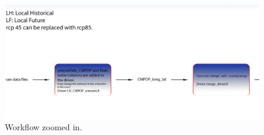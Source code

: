 \begin{enumerate}
\begin{figure}[htb]
  \centering
  \includegraphics[width=1\textwidth]{figures/pipe_Line_zoom}
  \caption{Workflow zoomed in.}
  \label{WorkflowZoom}
\end{figure}





\end{enumerate}